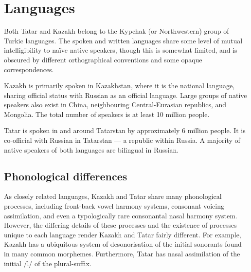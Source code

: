 \documentclass[11pt]{article}
\begin{document}


\section{Languages}
\label{sec:lang}

Both Tatar and Kazakh belong to the Kypchak (or Northwestern) group of Turkic
languages.  The spoken and written languages share some level of mutual intelligibility to naïve native speakers, though this is somewhat limited, and is obscured by different orthographical conventions and some opaque correspondences.

Kazakh is primarily spoken in Kazakhstan, where it is the national
language, sharing official status with Russian as an official language.
Large groups of native speakers also exist in China, neighbouring
Central-Eurasian republics, and Mongolia. The total number of speakers is at least 10 million people.

Tatar is spoken in and around Tatarstan by
approximately 6 million people. It is co-official with Russian in Tatarstan ---
a republic within Russia.  A majority of native speakers of both languages are bilingual in Russian. %

\subsection{Phonological differences}
As closely related languages, Kazakh and Tatar share many phonological processes, including front-back vowel harmony systems, consonant voicing assimilation, and even a typologically rare consonantal nasal harmony system.  However, the differing details of these processes and the existence of processes unique to each language render Kazakh and Tatar fairly different.  For example, Kazakh has a ubiquitous system of desonorisation of the initial sonorants found in many common morphemes.  Furthermore, Tatar has nasal assimilation of the initial /l/ of the plural-suffix.
\end{document}
